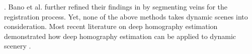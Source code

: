 \cite{bano2020deep}. Bano et al. further refined their findings in \cite{bano2020vessel} by segmenting veins for the registration process. Yet, none of the above methods takes dynamic scenes into consideration. Most recent literature on deep homography estimation demonstrated how deep homography estimation can be applied to dynamic scenery \cite{le2020deep, zhang2019content}.


